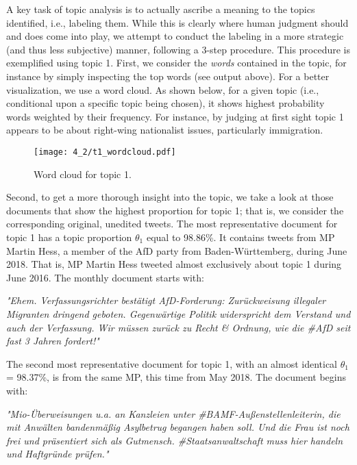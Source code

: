 \documentclass[12pt]{article}
\begin{document}
A key task of topic analysis is to actually ascribe a meaning to the topics identified, i.e., labeling them. While this is clearly where human judgment should and does come into play, we attempt to conduct the labeling in a more strategic (and thus less subjective) manner, following a 3-step procedure. This procedure is exemplified using topic 1. First, we consider the \textit{words} contained in the topic, for instance by simply inspecting the top words (see output above). For a better visualization, we use a word cloud. As shown below, for a given topic (i.e., conditional upon a specific topic being chosen), it shows highest probability words weighted by their frequency. For instance, by judging at first sight topic 1 appears to be about right-wing nationalist issues, particularly immigration.

\begin{figure}[h!]
  \centering
  \captionsetup{justification=centering,margin=2cm}
  \texttt{[image: 4\_2/t1\_wordcloud.pdf]}
  \caption{Word cloud for topic 1.}
  \label{fig:t1_wordcloud}
\end{figure}

Second, to get a more thorough insight into the topic, we take a look at those documents that show the highest proportion for topic 1; that is, we consider the corresponding original, unedited tweets. The most representative document for topic 1 has a topic proportion $\theta_1$ equal to 98.86\%. It contains tweets from MP Martin Hess, a member of the AfD party from Baden-Württemberg, during June 2018. That is, MP Martin Hess tweeted almost exclusively about topic 1 during June 2016. The monthly document starts with:

\vspace{0.5cm}
\noindent
\textit{"Ehem. Verfassungsrichter bestätigt AfD-Forderung: Zurückweisung illegaler Migranten dringend geboten. Gegenwärtige Politik widerspricht dem Verstand und auch der Verfassung. Wir müssen zurück zu Recht \& Ordnung, wie die \#AfD seit fast 3 Jahren fordert!"}
\vspace{0.5cm}

The second most representative document for topic 1, with an almost identical $\theta_1$ = 98.37\%, is from the same MP, this time from May 2018. The document begins with:

\vspace{0.5cm}
\noindent
\textit{"Mio-Überweisungen u.a. an Kanzleien unter \#BAMF-Außenstellenleiterin, die mit Anwälten bandenmäßig Asylbetrug begangen haben soll. Und die Frau ist noch frei und präsentiert sich als Gutmensch. \#Staatsanwaltschaft muss hier handeln und Haftgründe prüfen."}
\vspace{0.5cm}
\end{document}
